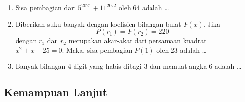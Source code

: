 \begin{enumerate}
\item Sisa pembagian dari $5^{2021}+11^{2022}$ oleh 64 adalah \dots

\item Diberikan suku banyak dengan koefisien bilangan bulat $P(x)$. Jika
$$P(r_1)=P(r_2)=220$$
dengan $r_1$ dan $r_2$ merupakan akar-akar dari persamaan kuadrat $x^2+x-25=0$. Maka, sisa pembagian $P(1)$ oleh $23$ adalah \dots

\item Banyak bilangan 4 digit yang habis dibagi 3 dan memuat angka 6 adalah \dots
\end{enumerate}

\newpage
\subsection{Kemampuan Lanjut}
